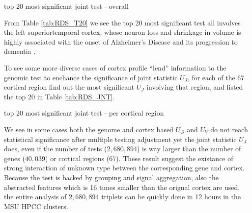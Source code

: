 \begin{table}[!htbp]
\centering

\caption{top 20 most significant joint test - overall}
\label{tab:RDS_T20}
\end{table}
From Table \ref{tab:RDS_T20} we see the top 20 most significant test all involves the left superiortemporal cortex, whose neuron loss and shrinkage in volume is highly associated with the onset of Alzheimer's Disease and its progression to dementia \cite{AD:ST1}. 

To see some more diverse cases of cortex profile ``lend'' information to the genomic test to enchance the significance of joint statistic $U_J$, for each of the 67 cortical region find out the most significant $U_J$ involving that region, and listed the top 20 in Table \ref{tab:RDS_JNT}.
\begin{table}[!htbp]
\centering

\caption{top 20 most significant joint test - per cortical region}
\label{tab:RDS_JNT}
\end{table}
We see in some cases both the genome and cortex based $U_G$ and $U_V$ do not reach statistical significance after multiple testing adjustment yet the joint statistic $U_J$ does, even if the number of tests ($2,680,894$) is way larger than the number of genes ($40,039$) or cortical regions ($67$). These result suggest the existance of strong interaction of unknown type between the corresponding gene and cortex. Because the test is backed by grouping and signal aggregation, also the abstracted features which is 16 times smaller than the orignal cortex are used, the entire analysis of $2,680,894$ triplets can be quickly done in 12 hours in the MSU HPCC clusters.